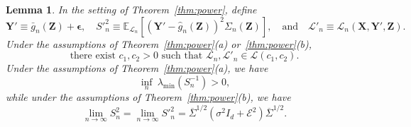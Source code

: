 \documentclass[ejs]{imsart}
\numberwithin{equation}{section}
\theoremstyle{plain}
\newtheorem{lemma}{Lemma}
\theoremstyle{definition}
\theoremstyle{remark}
\newcommand{\prx}{\bm X}
\newcommand{\prz}{\bm Z}
\newcommand{\pry}{{\bm Y}}
\newcommand{\peps}{\bm \epsilon}
\begin{document}
\begin{lemma} \label{lem:fourth-moment}
	In the setting of Theorem~\ref{thm:power}, define
	\begin{equation}
		\pry' \equiv \bar g_n(\prz) + \peps, \quad S'^2_{n} \equiv \mathbb E_{\mathcal L_n}[(\pry' - \widehat g_n(\prz))^2 \Sigma_n(\prz)], \quad \text{and} \quad \mathcal L'_n \equiv \mathcal L_n(\prx, \pry', \prz).
		\label{prime-definitions}
	\end{equation}
	Under the assumptions of Theorem~\ref{thm:power}(a) or~\ref{thm:power}(b), 
	\begin{equation}
		\text{there exist } c_1, c_2 > 0 \text{ such that } \mathcal L_n, \mathcal L'_n \in \mathscr L(c_1, c_2).
		\label{eighth-moment}
	\end{equation} 
	Under the assumptions of Theorem~\ref{thm:power}(a), we have
	\begin{equation}
	\inf_{n}\ \lambda_{\min}(S_n^{-1}) > 0,
	\label{eq:s-n-2-limit-a}
	\end{equation}
while under the assumptions of Theorem~\ref{thm:power}(b), we have
	\begin{equation}
		\lim_{n \rightarrow \infty} S_n^2 = \lim_{n \rightarrow \infty}  S'^2_n = \overline \Sigma^{1/2}(\sigma^2 I_d + \mathcal E^2)\overline \Sigma^{1/2}.
		\label{eq:s-n-2-limit}
	\end{equation}
	
\end{lemma}
\end{document}
